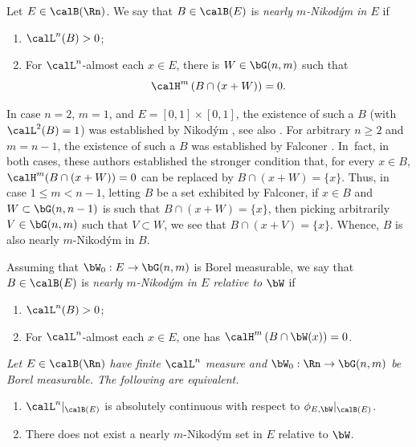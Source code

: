 \begin{Empty}
Let $E \in \calB(\Rn)$. We say that $B \in \calB(E)$ is \emph{nearly $m$-Nikod\'ym in $E$} if
\begin{enumerate}
\item $\calL^n(B) > 0$;
\item For $\calL^n$-almost each $x \in E$, there is $W \in \bG(n,m)$ such that
\[
\calH^m\left(B \cap (x+W) \right) = 0.
\]
\end{enumerate}
\par
In case $n=2$, $m=1$, and $E=[0,1] \times [0,1]$, the existence of such a $B$ (with $\calL^2(B)=1$) was established by Nikod\'ym \cite{NIK.27}, see also \cite[Chap.\,8]{GUZMAN.1981}.
For arbitrary $n \geq 2$ and $m=n-1$, the existence of such a $B$ was established by Falconer \cite{FAL.86}.
In~fact, in both cases, these authors established the stronger condition that, for every $x \in B$, $\calH^m(B \cap (x+W))=0$ can be replaced by $B \cap (x+W) = \{x\}$.
Thus, in case $1 \leq m< n-1$, letting $B$ be a set exhibited by Falconer, if $x \in B$ and $W \subset \bG(n,n-1)$ is such that $B \cap (x+W) = \{x\}$, then picking arbitrarily $V \in \bG(n,m)$ such that $V \subset W$, we see that $B \cap (x+V)=\{x\}$.
Whence, $B$ is also nearly $m$-Nikod\'ym in $B$.
\par
Assuming that $\bW_0: E \to \bG(n,m)$ is Borel measurable, we say that $B \in \calB(E)$ is \emph{nearly $m$-Nikod\'ym in $E$ relative to $\bW$} if
\begin{enumerate}
\item $\calL^n(B) > 0$;
\item For $\calL^n$-almost each $x \in E$, one has $\calH^m\left(B \cap \bW(x) \right) = 0$.
\end{enumerate}
\end{Empty}

\begin{Empty}[]
{\it
Let $E \in \calB(\Rn)$ have finite $\calL^n$ measure and $\bW_0: \Rn \to \bG(n,m)$ be Borel measurable. The following are equivalent.
\begin{enumerate}
\item\label{enum:18.1} $\calL^n |_{\calB(E)}$ is absolutely continuous with respect to $\phi_{E,\bW}|_{\calB(E)}$.
\item\label{enum:18.2} There does not exist a nearly $m$-Nikod\'ym set in $E$ relative to $\bW$.
\end{enumerate}
}
\end{Empty}

